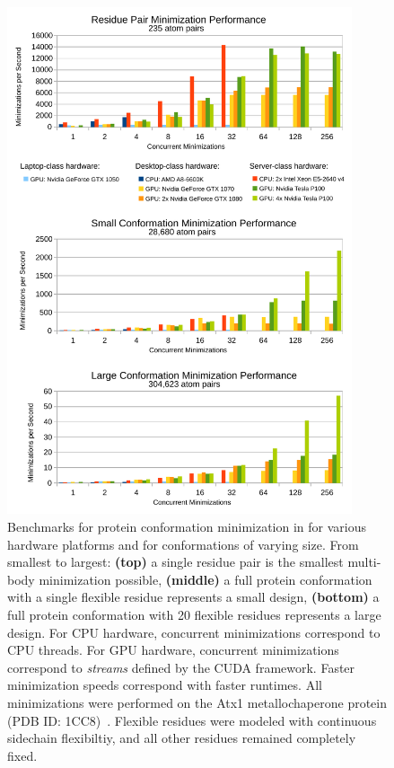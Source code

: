 \begin{figure}
\center
\includegraphics[width=4in]{figures/gpu.pdf}
\caption{Benchmarks for protein conformation minimization in  for various hardware platforms and for conformations of varying size. From smallest to largest: {\bf (top)} a single residue pair is the smallest multi-body minimization possible, {\bf (middle)} a full protein conformation with a single flexible residue represents a small design, {\bf (bottom)} a full protein conformation with 20 flexible residues represents a large design. For CPU hardware, concurrent minimizations correspond to CPU threads. For GPU hardware, concurrent minimizations correspond to {\it streams} defined by the CUDA framework. Faster minimization speeds correspond with faster \osprey runtimes. All minimizations were performed on the Atx1 metallochaperone protein (PDB ID: 1CC8)~\cite{1CC8}. Flexible residues were modeled with continuous sidechain flexibiltiy, and all other residues remained completely fixed.}
\label{fig:gpu}
\end{figure}
